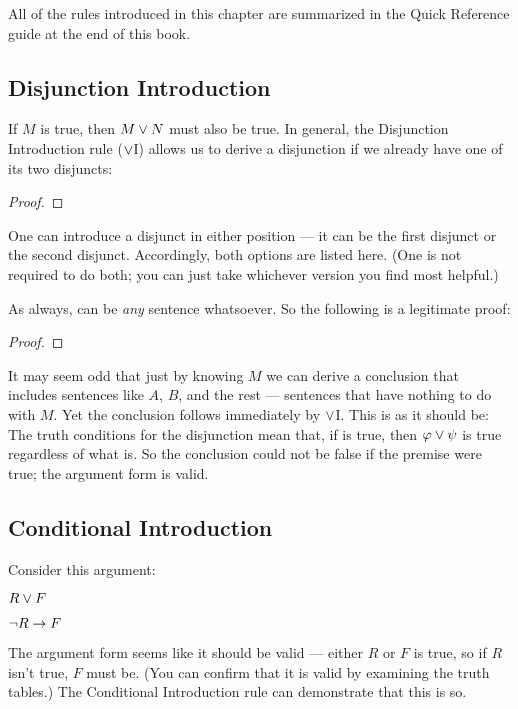 All of the rules introduced in this chapter are summarized in the Quick Reference guide at the end of this book.

\subsection{Disjunction Introduction}
If $M$ is true, then $M \vee N$ must also be true. In general, the Disjunction Introduction rule ($\vee$I) allows us to derive a disjunction if we already have one of its two disjuncts:

\begin{proof}
	\metaA{}
\end{proof}

One can introduce a disjunct in either position --- it can be the first disjunct or the second disjunct. Accordingly, both options are listed here. (One is not required to do both; you can just take whichever version you find most helpful.)

As always, \metaB{} can be \emph{any} sentence whatsoever. So the following is a legitimate proof:

\begin{proof}
\end{proof}

It may seem odd that just by knowing $M$ we can derive a conclusion that includes sentences like $A$, $B$, and the rest --- sentences that have nothing to do with $M$. Yet the conclusion follows immediately by $\vee$I. This is as it should be: The truth conditions for the disjunction mean that, if \metaA{} is true, then $\varphi{}\vee \psi{}$ is true regardless of what \metaB{} is. So the conclusion could not be false if the premise were true; the argument form is valid.



\subsection{Conditional Introduction}

Consider this argument:
\begin{earg}
\item[] $R \vee F$
\item[\therefore] $\neg R \rightarrow F$
\end{earg}
The argument form seems like it should be valid --- either $R$ or $F$ is true, so if $R$ isn't true, $F$ must be. (You can confirm that it is valid by examining the truth tables.) The Conditional Introduction rule can demonstrate that this is so.

